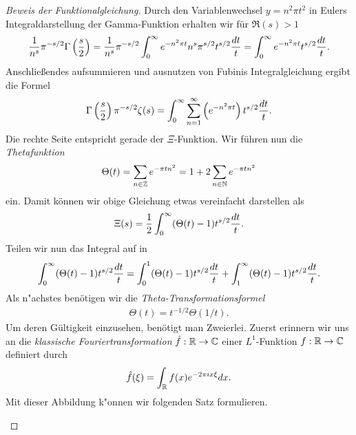 	\begin{proof}[Beweis der Funktionalgleichung]
		Durch den Variablenwechsel $y=n^2\pi t^2$ in Eulers Integraldarstellung der Gamma-Funktion erhalten wir für $\Re(s)>1$
		\begin{align*}
			\frac{1}{n^s} \pi^{-s/2}\Gamma\left(\frac{s}{2}\right) 
				= \frac{1}{n^s} \pi^{-s/2} \int_0^{\infty} e^{-n^2\pi t} n^s\pi^{s/2} t^{s/2} \frac{\dx[t]}{t} 
				= \int_{0}^{\infty} e^{-n^2\pi t}t^{s/2} \frac{\dx[t]}{t}.
		\end{align*}
		Anschließendes aufsummieren und ausnutzen von Fubinis Integralgleichung ergibt die Formel
		\begin{align*}
			\Gamma\left(\frac{s}{2}\right)\pi^{-s/2}\zeta(s) 
				= \int_{0}^{\infty} \sum_{n=1}^{\infty}\left(e^{-n^2\pi t}\right)t^{s/2} \frac{\dx[t]}{t}.
		\end{align*}
		Die rechte Seite entspricht gerade der $\Xi$-Funktion. 
		Wir führen nun die \emph{Thetafunktion}
		\begin{align*}
			\Theta(t) = \sum_{n\in \Z} e^{-\pi t n^2} = 1 + 2 \sum_{n\in\N}e^{-\pi t n^2}
		\end{align*}
		ein.
		Damit können wir obige Gleichung etwas vereinfacht darstellen als
		\begin{align*}
			\Xi(s) 
				= \frac{1}{2}\int_{0}^{\infty}(\Theta(t)-1)t^{s/2} \frac{\dx[t]}{t}.
		\end{align*}
		Teilen wir nun das Integral auf in
		\begin{align}
			\int_{0}^{\infty} (\Theta(t) - 1) t^{s/2}  \frac{\dx[t]}{t} = \int_{0}^{1} (\Theta(t) - 1) t^{s/2}  \frac{\dx[t]}{t} + \int_{1}^{\infty} (\Theta(t) - 1) t^{s/2}  \frac{\dx[t]}{t}.\label{eq:einleitung:riemann1}
		\end{align}
		Als n"achstes benötigen wir die \emph{Theta-Transformationsformel}
		\begin{align}
			\Theta(t) = t^{-1/2} \Theta(1/t).\label{eq:einleitung:thetatrafo}
		\end{align}
		Um deren Gültigkeit einzusehen, benötigt man Zweierlei. 
		Zuerst erinnern wir uns an die \emph{klassische Fouriertransformation} $\hat{f}:\R\to\Komplex$ einer $L^1$-Funktion $f:\R\to\Komplex$ definiert durch
		\begin{align*}
			\hat{f}(\xi) = \int_\R f(x)e^{-2\pi i x \xi} \dx.
		\end{align*}
		Mit dieser Abbildung k"onnen wir folgenden Satz formulieren.
		\begin{satz}
			\label{satz:einleitung:poisson}

\end{satz}
\end{proof}
